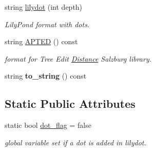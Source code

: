 \begin{DoxyCompactItemize}
string \mbox{\hyperlink{group__output_ga93aca0f691a35a081d51eaad06e8ce50}{lilydot}} (int depth)
\begin{DoxyCompactList}\small\item\em Lily\+Pond format with dots. \end{DoxyCompactList}\item 
string \mbox{\hyperlink{group__output_ga2c194b384127267b8cfed2c41e70d338}{A\+P\+T\+ED}} () const
\begin{DoxyCompactList}\small\item\em format for Tree Edit \mbox{\hyperlink{classDistance}{Distance}} Salzburg library. \end{DoxyCompactList}\item 
string {\bfseries to\+\_\+string} () const
\end{DoxyCompactItemize}
\subsection*{Static Public Attributes}
\begin{DoxyCompactItemize}
\item 
static bool \mbox{\hyperlink{group__output_ga774fcd89afe324f01efa6514626dd1cb}{dot\+\_\+flag}} = false
\begin{DoxyCompactList}\small\item\em global variable set if a dot is added in lilydot. \end{DoxyCompactList}\end{DoxyCompactItemize}
